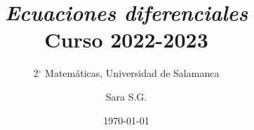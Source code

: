 \documentclass[12pt,twoside]{report}
\title{\textit{\textbf{Ecuaciones diferenciales}} \\ Curso 2022-2023}
\subtitle{2$^{\circ}$ Matemáticas, Universidad de Salamanca}
\author{Sara S.G.}
\date {\today}
\theoremstyle{azul}
\theoremstyle{azul2}
\theoremstyle{plain}
\theoremstyle{definition}
\theoremstyle{remark}
\begin{document}
\maketitle

\tableofcontents
\justifying



%
%
\end{document}
